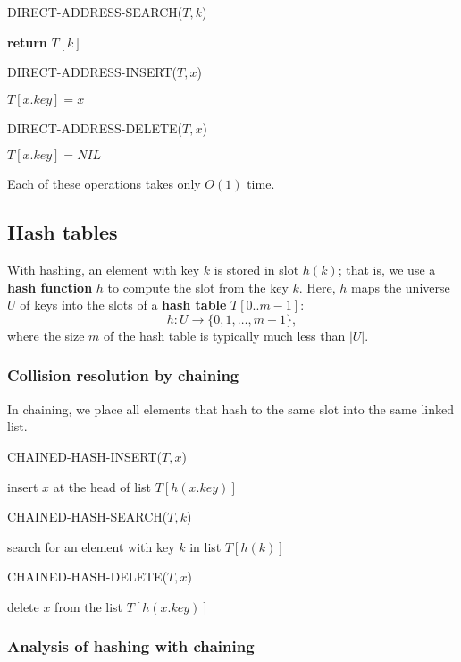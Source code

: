 \documentclass[12pt]{article}
\begin{document}
DIRECT-ADDRESS-SEARCH($T, k$)
\begin{algorithmic}[1]
\State \textbf {return} $T[k]$
\end{algorithmic}

DIRECT-ADDRESS-INSERT($T, x$)
\begin{algorithmic}[1]
\State $T[x.key] = x$
\end{algorithmic}

DIRECT-ADDRESS-DELETE($T, x$)
\begin{algorithmic}[1]
\State $T[x.key] = NIL$
\end{algorithmic}

Each of these operations takes only $O(1)$ time.

\subsection{Hash tables}

With hashing, an element with key $k$ is stored in slot $h(k)$; that is, we use a \textbf {hash function} $h$ to compute the slot from the key $k$. Here, $h$ maps the universe $U$ of keys into the slots of a \textbf {hash table} $T[0..m-1]$:
\begin{equation*}
  h: U \rightarrow \{ 0,1, \dots, m-1 \},
\end{equation*}
where the size $m$ of the hash table is typically much less than $|U|$.

\subsubsection*{Collision resolution by chaining}

In chaining, we place all elements that hash to the same slot into the same linked list.

CHAINED-HASH-INSERT($T, x$)
\begin{algorithmic}[1]
\State insert $x$ at the head of list $T[h(x.key)]$
\end{algorithmic}

CHAINED-HASH-SEARCH($T, k$)
\begin{algorithmic}[1]
\State search for an element with key $k$ in list $T[h(k)]$
\end{algorithmic}

CHAINED-HASH-DELETE($T, x$)
\begin{algorithmic}[1]
\State delete $x$ from the list $T[h(x.key)]$
\end{algorithmic}

\subsubsection*{Analysis of hashing with chaining}
\end{document}
